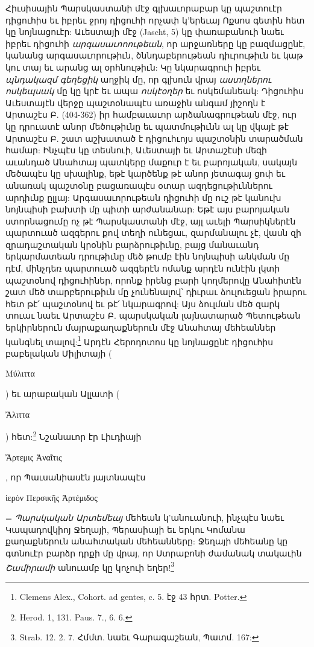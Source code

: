 \documentclass{article}
\begin{document}
{Հիւսիսային Պարսկաստանի մէջ գլխաւորաբար կը պաշտուէր դիցուհիս եւ իբրեւ ջրոյ դիցուհի որչափ կ'երեւայ Ոքսոս գետին հետ կը նոյնացուէր: Աւեստայի մէջ (Jascht, 5) կը փառաբանուի նաեւ իբրեւ դիցուհի \emph{արգասաւոոութեան}, որ արջառները կը բազմացընէ, կանանց արգասաւորութիւն, ծննդաբերութեան դիւրութիւն եւ կաթ կու տայ եւ արանց ալ օրհնութիւն: Կը նկարագրուի իբրեւ \emph{պնդակազմ գեղեցիկ} աղջիկ մը, որ գլխուն վրայ \emph{աստղներու ոսկեպսակ} մը կը կրէ եւ ապա \emph{ոսկէօղեր} եւ ոսկեմանեակ: Դիցուհիս Աւեստայէն վերջը պաշտօնապէս առաջին անգամ յիշողն է Արտաշէս Բ. (404-362) իր համբաւաւոր արձանագրութեան մէջ, ուր կը դրուատէ անոր մեծութիւնը եւ պատմութիւնն ալ կը վկայէ թէ Արտաշէս Բ. շատ աշխատած է դիցուհւոյս պաշտօնին տարածման համար: Ինչպէս կը տեսնուի, Աւեստայի եւ Արտաշէսի մեզի աւանդած Անահտայ պատկերը մաքուր է եւ բարոյական, սակայն մեծապէս կը սխալինք, եթէ կարծենք թէ անոր յետագայ ցոփ եւ անառակ պաշտօնը բացառապէս օտար ազդեցութիւններու արդիւնք ըլլայ: Արգասաւորութեան դիցուհի մը ուշ թէ կանուխ նոյնպիսի բախտի մը պիտի արժանանար: Եթէ այս բարոյական ստորնացումը ոչ թէ Պարսկաստանի մէջ, այլ աւելի Պարսիկներէն պարտուած ազգերու քով տեղի ունեցաւ, զարմանալու չէ, վասն զի զրադաշտական կրօնին բարձրութիւնը, բայց մանաւանդ երկարմատեան դրութիւնը մեծ թումբ էին նոյնպիսի անկման մը դէմ, մինչդեռ պարտուած ազգերէն ոմանք արդէն ունէին լկտի պաշտօնով դիցուհիներ, որոնք իրենց բարի կողմերովը Անահիտէն շատ մեծ տարբերութիւն մը չունենալով՝ դիւրաւ ձուլուեցան իրարու հետ թէ՛ պաշտօնով եւ թէ՛ նկարագրով: Այս ձուլման մեծ զարկ տուաւ նաեւ Արտաշէս Բ. պարսկական լայնատարած Պետութեան երկիրներուն մայրաքաղաքներուն մէջ Անահտայ մեհեաններ կանգնել տալով:\footnote{Clemens Alex., Cohort. ad gentes, c. 5. էջ 43 հրտ. Potter.} Արդէն Հերոդոտոս կը նոյնացընէ դիցուհիս բաբելական Միլիտայի (\begin{greek}Μύλιττα\end{greek}) եւ արաբական Ալլատի (\begin{greek}Ἄλιττα\end{greek}) հետ:\footnote{Herod. 1, 131. Paus. 7., 6. 6.} Նշանաւոր էր Լիւդիայի \begin{greek}Ἄρτεμις Ἀναῖτις\end{greek}, որ Պաւսանիասէն յայտնապէս \begin{greek}ἱερὸν Περσικῆς Ἀρτέμιδος\end{greek} = \emph{Պարսկական Արտեմեայ} մեհեան կ'անուանուի, ինչպէս նաեւ Կապադովկիոյ Ջեղայի, Պերասիայի եւ երկու Կոմանա քաղաքներուն անահտական մեհեանները: Ջեղայի մեհեանը կը գտնուէր բարձր դրքի մը վրայ, որ Ստրաբոնի ժամանակ տակաւին \emph{Շամիրամի} անուամբ կը կոչուի եղեր!\footnote{Strab. 12. 2. 7. Հմմտ. նաեւ Գարագաշեան, Պատմ. 167:}

}
\end{document}
